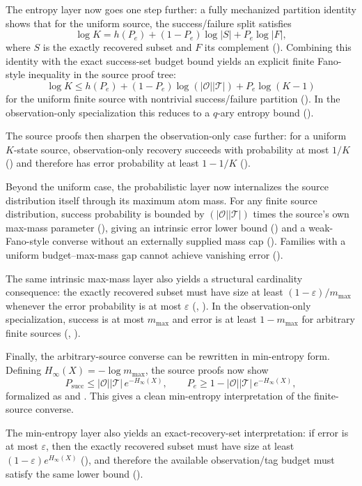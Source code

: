 The entropy layer now goes one step further: a fully mechanized partition identity shows that for the uniform source, the success/failure split satisfies
\[
\log K = h(P_e) + (1-P_e)\log |S| + P_e\log |F|,
\]
where $S$ is the exactly recovered subset and $F$ its complement (). Combining this identity with the exact success-set budget bound yields an explicit finite Fano-style inequality in the source proof tree:
\[
\log K \le h(P_e) + (1-P_e)\log(|\mathcal O||\mathcal T|) + P_e\log(K-1)
\]
for the uniform finite source with nontrivial success/failure partition (). In the observation-only specialization this reduces to a $q$-ary entropy bound ().

The source proofs then sharpen the observation-only case further: for a uniform $K$-state source, observation-only recovery succeeds with probability at most $1/K$ () and therefore has error probability at least $1-1/K$ ().

Beyond the uniform case, the probabilistic layer now internalizes the source distribution itself through its maximum atom mass. For any finite source distribution, success probability is bounded by $(|\mathcal O||\mathcal T|)$ times the source's own max-mass parameter (), giving an intrinsic error lower bound () and a weak-Fano-style converse without an externally supplied mass cap (). Families with a uniform budget--max-mass gap cannot achieve vanishing error ().

The same intrinsic max-mass layer also yields a structural cardinality consequence: the exactly recovered subset must have size at least $(1-\varepsilon)/m_{\max}$ whenever the error probability is at most $\varepsilon$ (, ). In the observation-only specialization, success is at most $m_{\max}$ and error is at least $1-m_{\max}$ for arbitrary finite sources (, ).

Finally, the arbitrary-source converse can be rewritten in min-entropy form. Defining $H_{\infty}(X)=-\log m_{\max}$, the source proofs now show
\[
P_{\mathrm{succ}} \le |\mathcal O||\mathcal T|\, e^{-H_{\infty}(X)},
\qquad
P_e \ge 1-|\mathcal O||\mathcal T|\, e^{-H_{\infty}(X)},
\]
formalized as  and . This gives a clean min-entropy interpretation of the finite-source converse.

The min-entropy layer also yields an exact-recovery-set interpretation: if error is at most $\varepsilon$, then the exactly recovered subset must have size at least $(1-\varepsilon)e^{H_{\infty}(X)}$ (), and therefore the available observation/tag budget must satisfy the same lower bound ().

